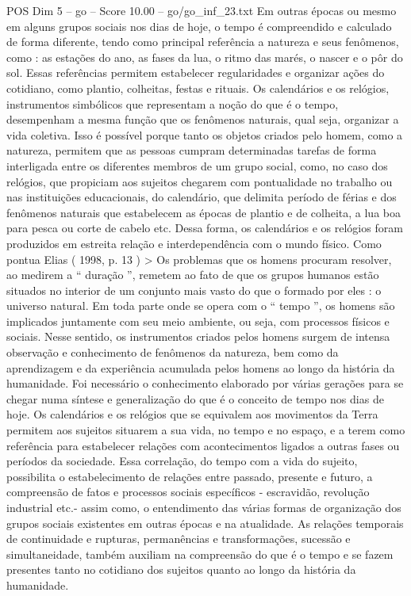 \begin{textsample}{POS Dim 5 – go – Score 10.00 – go/go\_inf\_23.txt}
Em outras épocas ou mesmo em alguns grupos sociais nos dias de hoje, o tempo é compreendido e calculado de forma diferente, tendo como principal referência a natureza e seus fenômenos, como : as estações do ano, as fases da lua, o ritmo das marés, o nascer e o pôr do sol.
Essas referências permitem estabelecer regularidades e organizar ações do cotidiano, como plantio, colheitas, festas e rituais.
Os calendários e os relógios, instrumentos simbólicos que representam a noção do que é o tempo, desempenham a mesma função que os fenômenos naturais, qual seja, organizar a vida coletiva.
Isso é possível porque tanto os objetos criados pelo homem, como a natureza, permitem que as pessoas cumpram determinadas tarefas de forma interligada entre os diferentes membros de um grupo social, como, no caso dos relógios, que propiciam aos sujeitos chegarem com pontualidade no trabalho ou nas instituições educacionais, do calendário, que delimita período de férias e dos fenômenos naturais que estabelecem as épocas de plantio e de colheita, a lua boa para pesca ou corte de cabelo etc.
Dessa forma, os calendários e os relógios foram produzidos em estreita relação e interdependência com o mundo físico.
Como pontua Elias ( 1998, p. 13 ) > Os problemas que os homens procuram resolver, ao medirem a “ duração ”, remetem ao fato de que os grupos humanos estão situados no interior de um conjunto mais vasto do que o formado por eles : o universo natural.
Em toda parte onde se opera com o “ tempo ”, os homens são implicados juntamente com seu meio ambiente, ou seja, com processos físicos e sociais.
Nesse sentido, os instrumentos criados pelos homens surgem de intensa observação e conhecimento de fenômenos da natureza, bem como da aprendizagem e da experiência acumulada pelos homens ao longo da história da humanidade.
Foi necessário o conhecimento elaborado por várias gerações para se chegar numa síntese e generalização do que é o conceito de tempo nos dias de hoje.
Os calendários e os relógios que se equivalem aos movimentos da Terra permitem aos sujeitos situarem a sua vida, no tempo e no espaço, e a terem como referência para estabelecer relações com acontecimentos ligados a outras fases ou períodos da sociedade.
Essa correlação, do tempo com a vida do sujeito, possibilita o estabelecimento de relações entre passado, presente e futuro, a compreensão de fatos e processos sociais específicos - escravidão, revolução industrial etc.- assim como, o entendimento das várias formas de organização dos grupos sociais existentes em outras épocas e na atualidade.
As relações temporais de continuidade e rupturas, permanências e transformações, sucessão e simultaneidade, também auxiliam na compreensão do que é o tempo e se fazem presentes tanto no cotidiano dos sujeitos quanto ao longo da história da humanidade.

\end{textsample}
